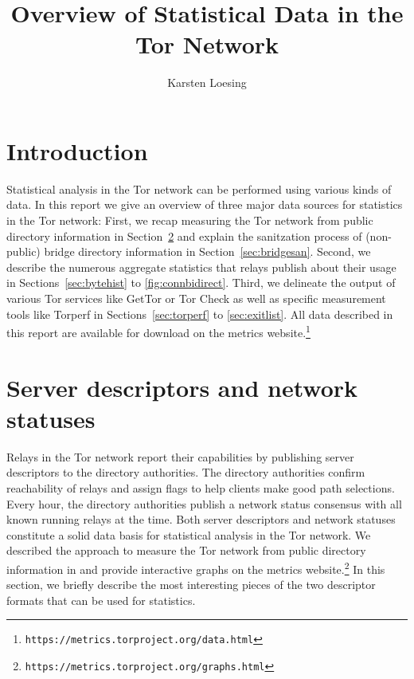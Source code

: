 \documentclass{article}
\begin{document}
\title{Overview of Statistical Data in the Tor Network}
\author{Karsten Loesing}
\maketitle

\section{Introduction}

Statistical analysis in the Tor network can be performed using various
kinds of data.
In this report we give an overview of three major data sources for
statistics in the Tor network:
First, we recap measuring the Tor network from public directory
information \cite{loesing2009measuring} in Section~\ref{sec:serverdesc}
and explain the sanitzation process of (non-public) bridge directory
information in Section~\ref{sec:bridgesan}.
Second, we describe the numerous aggregate statistics that relays publish
about their usage \cite{loesing2010case}
in Sections~\ref{sec:bytehist} to \ref{fig:connbidirect}.
Third, we delineate the output of various Tor services like GetTor or
Tor Check as well as specific measurement tools like Torperf in
Sections~\ref{sec:torperf} to \ref{sec:exitlist}.
All data described in this report are available for download on the
metrics
website.\footnote{\texttt{https://metrics.torproject.org/data.html}}

\section{Server descriptors and network statuses}
\label{sec:serverdesc}

Relays in the Tor network report their capabilities by publishing server
descriptors to the directory authorities.
The directory authorities confirm reachability of relays and assign flags
to help clients make good path selections.
Every hour, the directory authorities publish a network status consensus
with all known running relays at the time.
Both server descriptors and network statuses constitute a solid data basis
for statistical analysis in the Tor network.
We described the approach to measure the Tor network from public directory
information in \cite{loesing2009measuring} and provide interactive
graphs on the metrics
website.\footnote{\texttt{https://metrics.torproject.org/graphs.html}}
In this section, we briefly describe the most interesting pieces of the
two descriptor formats that can be used for statistics.
\end{document}
